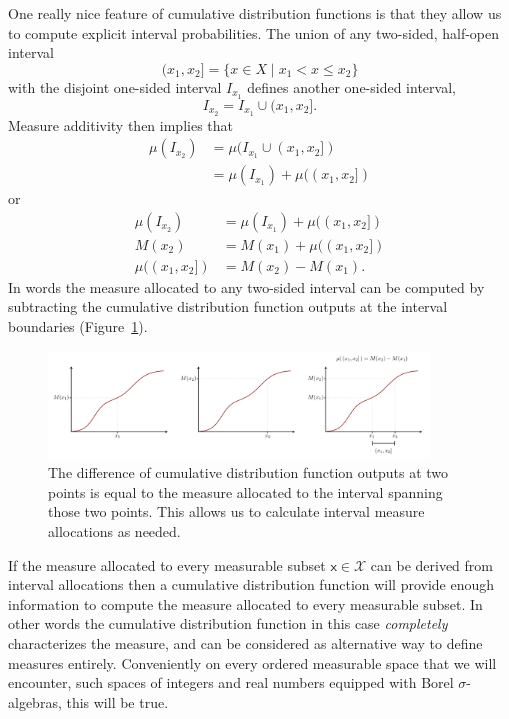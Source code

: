 \documentclass[
  letterpaper,
  DIV=11,
  numbers=noendperiod]{scrartcl}
\begin{document}
One really nice feature of cumulative distribution functions is that
they allow us to compute explicit interval probabilities. The union of
any two-sided, half-open interval \[
( x_{1}, x_{2} ] = \{ x \in X \mid x_{1} < x \le x_{2} \}
\] with the disjoint one-sided interval \(I_{x_{1}}\) defines another
one-sided interval, \[
I_{x_{2}} = I_{x_{1}} \cup (x_{1}, x_{2}].
\] Measure additivity then implies that \begin{align*}
\mu(I_{x_{2}})
&= \mu(I_{x_{1}} \cup (x_{1}, x_{2}] )
\\
&= \mu(I_{x_{1}}) + \mu( (x_{1}, x_{2}] )
\end{align*} or \begin{align*}
\mu(I_{x_{2}})
&=
\mu(I_{x_{1}}) + \mu( (x_{1}, x_{2}] )
\\
M(x_{2})
&=
M(x_{1}) + \mu( (x_{1}, x_{2}] )
\\
\mu( (x_{1}, x_{2}] )
&
= M(x_{2})  - M(x_{1}).
\end{align*} In words the measure allocated to any two-sided interval
can be computed by subtracting the cumulative distribution function
outputs at the interval boundaries (Figure~\ref{fig-cdf-probs}).

\begin{figure}

{\centering \includegraphics[width=0.9\textwidth,height=\textheight]{figures/cdfs/cdf_probs/cdf_probs.pdf}

}

\caption{\label{fig-cdf-probs}The difference of cumulative distribution
function outputs at two points is equal to the measure allocated to the
interval spanning those two points. This allows us to calculate interval
measure allocations as needed.}

\end{figure}

If the measure allocated to every measurable subset
\(\mathsf{x} \in \mathcal{X}\) can be derived from interval allocations
then a cumulative distribution function will provide enough information
to compute the measure allocated to every measurable subset. In other
words the cumulative distribution function in this case
\emph{completely} characterizes the measure, and can be considered as
alternative way to define measures entirely. Conveniently on every
ordered measurable space that we will encounter, such spaces of integers
and real numbers equipped with Borel \(\sigma\)-algebras, this will be
true.
\end{document}
